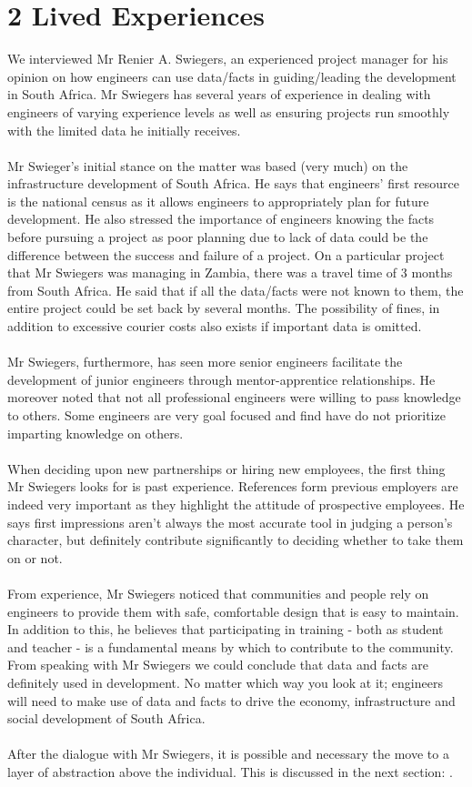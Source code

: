 \chapter*{2 Lived Experiences}
\label{lexp}
We interviewed Mr Renier A. Swiegers, an experienced project manager for his opinion on how engineers can use data/facts in guiding/leading the development in South Africa. Mr Swiegers has several years of experience in dealing with engineers of varying experience levels as well as ensuring projects run smoothly with the limited data he initially receives.
\\\\ 
Mr Swieger's initial stance on the matter was based (very much) on the infrastructure development of South Africa. He says that engineers’ first resource is the national census as it allows engineers to appropriately plan for future development. He also stressed the importance of engineers knowing the facts before pursuing a project as poor planning due to lack of data could be the difference between the success and failure of a project. On a particular project that Mr Swiegers was managing in Zambia, there was a travel time of 3 months from South Africa. He said that if all the data/facts were not known to them, the entire project could be set back by several months. The possibility of fines, in addition to excessive courier costs also exists if important data is omitted.
\\\\
Mr Swiegers, furthermore, has seen more senior engineers facilitate the development of junior engineers through mentor-apprentice relationships. He moreover noted that not all professional engineers were willing to pass knowledge to others. Some engineers are very goal focused and find have do not prioritize imparting knowledge on others.
\\\\
When deciding upon new partnerships or hiring new employees, the first thing Mr Swiegers looks for is past experience. References form previous employers are indeed very important as they highlight the attitude of prospective employees. He says first impressions aren’t always the most accurate tool in judging a person’s character, but definitely contribute significantly to deciding whether to take them on or not.
\\\\
From experience, Mr Swiegers noticed that communities and people rely on engineers to provide them with safe, comfortable design that is easy to maintain. In addition to this, he believes that participating in training - both as student and teacher - is a fundamental means by which to contribute to the community.
From speaking with Mr Swiegers we could conclude that data and facts are definitely used in development. No matter which way you look at it; engineers will need to make use of data and facts to drive the economy, infrastructure and social development of South Africa.
\\\\
After the dialogue with Mr Swiegers, it is possible and necessary the move to a layer of abstraction above the individual. This is discussed in the next section: \textbf{}.

